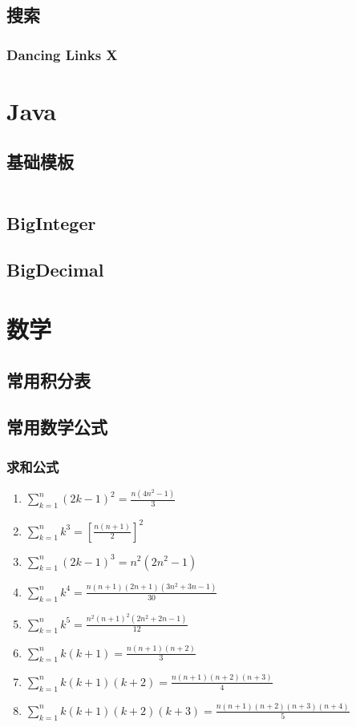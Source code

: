 \documentclass[a4paper]{article}
\newcommand{\javacode}[1]{
    \inputminted[mathescape]{java}{source/#1}
}
\begin{document}
\subsection{搜索}

\subsubsection{Dancing Links X}

\section{Java}

\subsection{基础模板}

\javacode{template.java}

\subsection{BigInteger}

\subsection{BigDecimal}

\section{数学}

\subsection{常用积分表}

\subsection{常用数学公式}

\subsubsection{求和公式}

\begin{enumerate}
	\item $\sum_{k=1}^{n}(2k-1)^2 = \frac{n(4n^2-1)}{3}	$
	\item $\sum_{k=1}^{n}k^3 = [\frac{n(n+1)}{2}]^2	$
	\item $\sum_{k=1}^{n}(2k-1)^3 = n^2(2n^2-1)	$
	\item $\sum_{k=1}^{n}k^4 = \frac{n(n+1)(2n+1)(3n^2+3n-1)}{30}  $
	\item $\sum_{k=1}^{n}k^5 = \frac{n^2(n+1)^2(2n^2+2n-1)}{12}	$
	\item $\sum_{k=1}^{n}k(k+1) = \frac{n(n+1)(n+2)}{3}	$
	\item $\sum_{k=1}^{n}k(k+1)(k+2) = \frac{n(n+1)(n+2)(n+3)}{4} $
	\item $\sum_{k=1}^{n}k(k+1)(k+2)(k+3) = \frac{n(n+1)(n+2)(n+3)(n+4)}{5} $
\end{enumerate}
\end{document}
